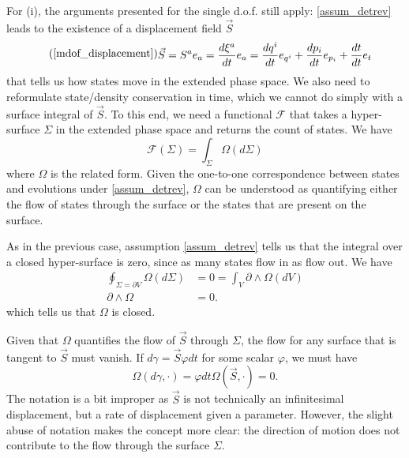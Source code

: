 \documentclass[fleqn,10pt]{wlscirep}
\begin{document}
For (i), the arguments presented for the single d.o.f. still apply: \ref{assum_detrev} leads to the existence of a displacement field $\vec{S}$
\begin{equation}
\tag*{(\ref{mdof_displacement})}
	\begin{aligned}
		\vec{S} &= S^a e_a = \frac{d\xi^a}{dt} e_a =\frac{dq^i}{dt} e_{q^i} + \frac{dp_i}{dt} e_{p_i} + \frac{dt}{dt} e_t
	\end{aligned}
\end{equation}
that tells us how states move in the extended phase space. We also need to reformulate state/density conservation in time, which we cannot do simply with a surface integral of $\vec{S}$. To this end, we need a functional $\mathcal{F}$ that takes a hyper-surface $\Sigma$ in the extended phase space and returns the count of states. We have 
\begin{equation}
	\mathcal{F}(\Sigma) = \int_\Sigma \Omega(d\Sigma)
\end{equation}
where $\Omega$ is the related form. Given the one-to-one correspondence between states and evolutions under \ref{assum_detrev}, $\Omega$ can be understood as quantifying either the flow of states through the surface or the states that are present on the surface.

As in the previous case, assumption \ref{assum_detrev} tells us that the integral over a closed hyper-surface is zero, since as many states flow in as flow out. We have
\begin{equation}
	\begin{aligned}
		\oint_{\Sigma = \partial V} \Omega(d\Sigma) &= 0 = \int_V \partial \wedge \Omega(dV) \\
		\partial \wedge\Omega &= 0.
	\end{aligned}
\end{equation}
which tells us that $\Omega$ is closed.

Given that $\Omega$ quantifies the flow of $\vec{S}$ through $\Sigma$, the flow for any surface that is tangent to $\vec{S}$ must vanish. If $d\gamma = \vec{S} \varphi dt$ for some scalar $\varphi$, we must have
\begin{equation}
	\Omega(d\gamma, \cdot) = \varphi dt \Omega(\vec{S}, \cdot) = 0.
\end{equation}
The notation is a bit improper as $\vec{S}$ is not technically an infinitesimal displacement, but a rate of displacement given a parameter. However, the slight abuse of notation makes the concept more clear: the direction of motion does not contribute to the flow through the surface $\Sigma$.
\end{document}
